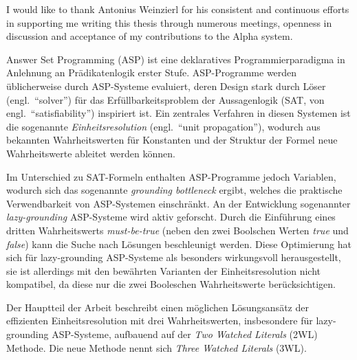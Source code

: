 \documentclass[final]{vutinfth} %
\newcommand{\mbt}{must-be-true\xspace}
\begin{document}
\frontmatter %

\addstatementpage


\begin{acknowledgements*}
I would like to thank Antonius Weinzierl for his consistent and continuous efforts in supporting me writing this thesis through numerous meetings, openness in discussion and acceptance of my contributions to the Alpha system.
\end{acknowledgements*}


\begin{kurzfassung*}
Answer Set Programming (ASP) ist eine deklaratives Programmierparadigma in Anlehnung an Prädikatenlogik erster Stufe. ASP-Programme werden üblicherweise durch ASP-Systeme evaluiert, deren Design stark durch Löser (engl.~\enquote{solver}) für das Erfüllbarkeitsproblem der Aussagenlogik (SAT, von engl.~\enquote{satisfiability}) inspiriert ist. Ein zentrales Verfahren in diesen Systemen ist die sogenannte \emph{Einheitsresolution} (engl.~\enquote{unit propagation}), wodurch aus bekannten Wahrheitswerten für Konstanten und der Struktur der Formel neue Wahrheitswerte ableitet werden können.

Im Unterschied zu SAT-Formeln enthalten ASP-Programme jedoch Variablen, wodurch sich das sogenannte \emph{grounding bottleneck} ergibt, welches die praktische Verwendbarkeit von ASP-Systemen einschränkt. An der Entwicklung sogenannter \emph{lazy-grounding} ASP-Systeme wird aktiv geforscht. Durch die Einführung eines dritten Wahrheitswerts \emph{\mbt} (neben den zwei Boolschen Werten \emph{true} und \emph{false}) kann die Suche nach Lösungen beschleunigt werden. Diese Optimierung hat sich für lazy-grounding ASP-Systeme als besonders wirkungsvoll herausgestellt, sie ist allerdings mit den bewährten Varianten der Einheitsresolution nicht kompatibel, da diese nur die zwei Booleschen Wahrheitswerte berücksichtigen.

Der Hauptteil der Arbeit beschreibt einen möglichen Lösungsansätz der effizienten Einheitsresolution mit drei Wahrheitswerten, insbesondere für lazy-grounding ASP-Systeme, aufbauend auf der \emph{Two Watched Literals} (2WL) Methode. Die neue Methode nennt sich \emph{Three Watched Literals} (3WL).


\end{kurzfassung*}
\end{document}
